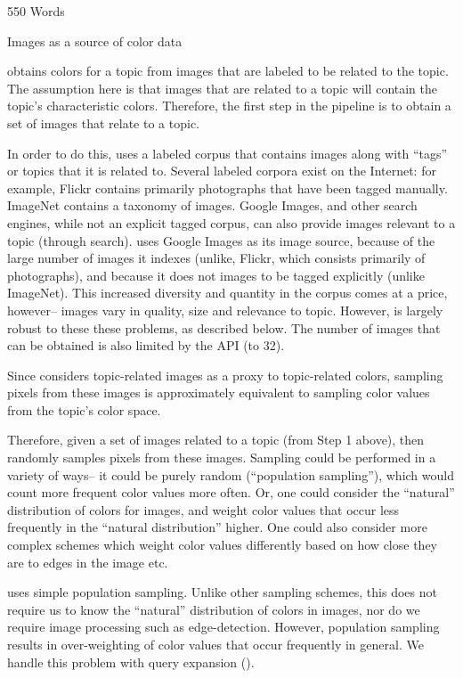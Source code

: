 550 Words

Images as a source of color data

\system obtains colors for a topic from images that are labeled to be related to the topic. The assumption here is that images that are related to a topic will contain the topic's characteristic colors. Therefore, the first step in the \system pipeline is to obtain a set of images that relate to a topic.

In order to do this, \system uses a labeled corpus that contains images along with ``tags'' or topics that it is related to. Several labeled corpora exist on the Internet: for example, Flickr contains primarily photographs that have been tagged manually. ImageNet contains a taxonomy of images.  Google Images, and other search engines, while not an explicit tagged corpus, can also provide images relevant to a topic (through search). \system uses Google Images as its image source, because of the large number of images it indexes (unlike, Flickr, which consists primarily of photographs), and because it does not images to be tagged explicitly (unlike ImageNet). This increased diversity and quantity in the corpus comes at a price, however-- images vary in quality, size and relevance to topic. However, \system is largely robust to these these problems, as described below. The number of images that can be obtained is also limited by the API (to 32).

Since \system considers topic-related images as a proxy to topic-related colors, sampling pixels from these images is approximately equivalent to sampling color values from the topic's color space. 

Therefore, given a set of images related to a topic (from Step 1 above), \system then randomly samples pixels from these images. Sampling could be performed in a variety of ways-- it could be purely random (``population sampling''), which would count more frequent color values more often. Or, one could consider the ``natural'' distribution of colors for images, and weight color values that occur less frequently in the ``natural distribution'' higher. One could also consider more complex schemes which weight color values differently based on how close they are to edges in the image etc.

\system uses simple population sampling. Unlike other sampling schemes, this does not require us to know the ``natural'' distribution of colors in images, nor do we require image processing such as edge-detection. However, population sampling results in over-weighting of color values that occur frequently in general. We handle this problem with query expansion ().

